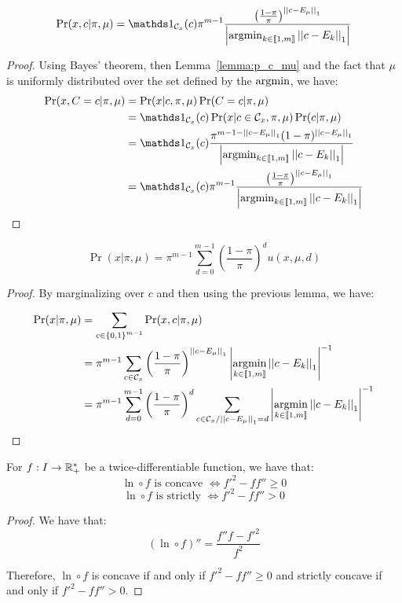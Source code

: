 \begin{lemma}
    \label{lemma:p_x_c_knowing_pi_mu_appendix}
    \[\Pr(x, c | \pi, \mu) = \indic{}_{\mathcal{C}_x}(c) \pi^{m-1}  \frac{\left(\frac{1 - \pi}{\pi}\right)^{\norm{c - E_{\mu}}_1}}{\card{\argmin_{k \in \bbrack{1, m}} \norm{c - E_k}_1}} \]
\end{lemma}
\begin{proof}
    Using Bayes' theorem, then Lemma~\ref{lemma:p_c_mu} and the fact that $\mu$ is uniformly distributed over the set defined by the $\operatorname*{argmin}$, we have:
    \begin{align}
        \Pr(x, C=c | \pi, \mu)
        &= \Pr(x | c, \pi, \mu) \Pr(C = c | \pi, \mu)\\
        &=  \indic{}_{\mathcal{C}_x}(c) \Pr(x | c \in \mathcal{C}_x, \pi, \mu) \Pr(c | \pi, \mu)\\
        &= \indic{}_{\mathcal{C}_x}(c) \frac{\pi^{m - 1 - \norm{c - E_{\mu}}_1} (1 - \pi)^{\norm{c - E_{\mu}}_1}}{\card{\argmin_{k \in \bbrack{1, m}} \norm{c - E_k}_1}}\\
        &= \indic{}_{\mathcal{C}_x}(c) \pi^{m-1}  \frac{\left(\frac{1 - \pi}{\pi}\right)^{\norm{c - E_{\mu}}_1}}{\card{\argmin_{k \in \bbrack{1, m}} \norm{c - E_k}_1}}
    \end{align}
\end{proof}


\begin{thm}
    \label{thm:p_x_knowing_pi_mu}
    \[\Pr(x | \pi, \mu) = \pi^{m-1} \sum_{d = 0}^{m-1} \left(\frac{1 - \pi}{\pi}\right)^d u(x, \mu, d)\]
\end{thm}
\begin{proof}
    By marginalizing over $c$ and then using the previous lemma, we have:

\begin{align}
    \Pr(x | \pi, \mu)
    &= \sum_{c \in \left\{ 0, 1 \right\}^{m-1}} \Pr(x, c | \pi, \mu)\\
    &= \pi^{m-1} \sum_{c \in \mathcal{C}_x} \left(\frac{1 - \pi}{\pi}\right)^{\left|\left|c - E_{\mu}\right|\right|_1} \left|\operatorname*{argmin}_{k \in \left\llbracket1, m\right\rrbracket} \left|\left|c - E_k\right|\right|_1\right|^{-1}\\
    &= \pi^{m-1} \sum_{d = 0}^{m-1} \left(\frac{1 - \pi}{\pi}\right)^d \sum_{c \in \mathcal{C}_x / \left|\left|c - E_{\mu}\right|\right|_1 = d}  \left|\operatorname*{argmin}_{k \in \left\llbracket1, m\right\rrbracket} \left|\left|c - E_k\right|\right|_1\right|^{-1}
\end{align}
\end{proof}

\begin{lemma}
    \label{lemma:concavity_log_composed_functions}
    For $f: I \rightarrow \mathbb{R}_+^*$ be a twice-differentiable function, we have that:
    \[ \ln \circ f \text{ is concave } \iff  f'^2 - f f'' \geq 0 \]
    \[ \ln \circ f \text{ is strictly } \iff f'^2 - f f'' > 0 \]
\end{lemma}
\begin{proof}
    We have that:
    \[ (\ln \circ f)'' = \frac{f''f - f'^2}{f^2} \]
    
    Therefore, $\ln \circ f$ is concave if and only if $f'^2 - f f'' \geq 0$ and strictly concave if and only if $f'^2 - f f'' > 0$.
\end{proof}


